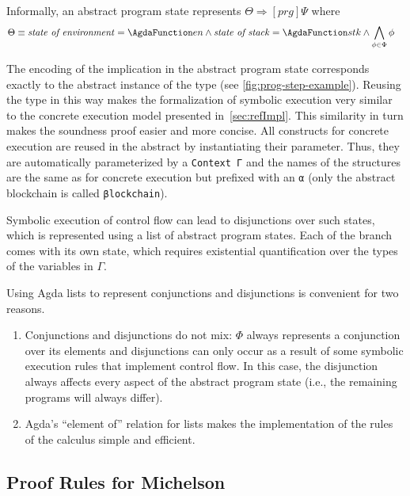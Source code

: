 Informally, an abstract program state
represents $\Theta \Longrightarrow [ prg ] \Psi$ where
\begin{align*}
	\Theta&\equiv	\text{\emph{state of environment}} = \AFun{en}
\land	\text{\emph{state of stack}} = \AFun{stk}
\land	\bigwedge_{\phi \in \Phi} \phi
\end{align*}

The encoding of the implication in the abstract program state
corresponds exactly to the abstract instance of the 
 type (see \autoref{fig:prog-step-example}). Reusing the type in this way makes the
formalization of symbolic execution very similar to the concrete
execution model presented in~\autoref{sec:refImpl}.
This similarity in turn makes the soundness proof easier and more concise.
All constructs for concrete execution are reused in the abstract by
instantiating their  parameter.
Thus, they  are automatically parameterized by a \verb/Context Γ/ and the names of the
structures are the same as for concrete execution but prefixed with an \verb/α/
(only the abstract blockchain is called \verb/βlockchain/).


Symbolic execution of control flow can lead to disjunctions over such
states, which is represented using a list of abstract program
states. Each of the branch comes with its own state, which requires
existential quantification over the types of the variables in $\Gamma$.
\AbstractUProgState

Using Agda lists to represent conjunctions and disjunctions is
convenient for two reasons.
\begin{enumerate}
\item Conjunctions and disjunctions do not mix: $\Phi$ always represents a conjunction over its elements
  and disjunctions can only occur as a result of some
  symbolic execution rules that implement control flow. 
  In this case, the disjunction always affects every aspect of the abstract program state
  (i.e., the remaining programs will always differ).
\item Agda's ``element of'' relation for lists makes the
  implementation of the rules of the calculus simple and efficient.
\end{enumerate}

\subsection{Proof Rules for Michelson}
\label{sec:calculus}

